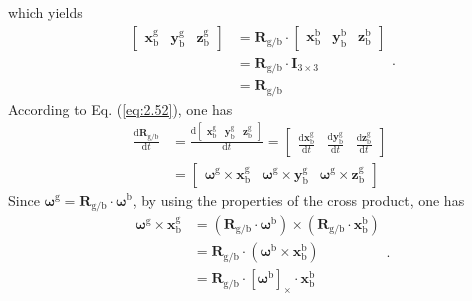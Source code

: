 which yields
\begin{equation}
\begin{array}{ll}
\left[\begin{array}{ccc}
\mathbf{x}_{\text{b}}^{\text{g}} & \mathbf{y}_{\text{b}}^{\text{g}} & \mathbf{z}_{\text{b}}^{\text{g}}\end{array}\right] & ={\mathbf{R}}_{\text{{g}/{b}}}\cdot\left[\begin{array}{ccc}
\mathbf{x}_{\text{b}}^{\text{b}} & \mathbf{y}_{\text{b}}^{\text{b}} & \mathbf{z}_{\text{b}}^{\text{b}}\end{array}\right]\\
& ={\mathbf{R}}_{\text{{g}/{b}}}\cdot\mathbf{I}_{3\times3}\\
& ={\mathbf{R}}_{\text{{g}/{b}}}
\end{array}.
\end{equation}
According to Eq. (\ref{eq:2.52}), one has 
\begin{equation}
\begin{array}{ll}
\frac{\text{d}{{\mathbf{R}}_{\text{{g}/{b}}}}}{\text{d}t} & =\frac{\text{d}\left[\begin{array}{ccc}
	\mathbf{x}_{\text{b}}^{\text{g}} & \mathbf{y}_{\text{b}}^{\text{g}} & \mathbf{z}_{\text{b}}^{\text{g}}\end{array}\right]}{\text{d}t}=\left[\begin{array}{clc}
\frac{\text{d}\mathbf{x}_{\text{b}}^{\text{g}}}{\text{d}t} & \frac{\text{d}\mathbf{y}_{\text{b}}^{\text{g}}}{\text{d}t} & \frac{\text{d}\mathbf{z}_{\text{b}}^{\text{g}}}{\text{d}t}\end{array}\right]\\
& =\left[\begin{array}{ccc}
{\boldsymbol{\omega}}^{\text{g}}\times\mathbf{x}_{\text{b}}^{\text{g}} & {\boldsymbol{\omega}}^{\text{g}}\times\mathbf{y}_{\text{b}}^{\text{g}} & {\boldsymbol{\omega}}^{\text{g}}\times\mathbf{z}_{\text{b}}^{\text{g}}\end{array}\right]
\end{array}\label{eq:2.55}
\end{equation}
Since ${{\boldsymbol{\omega}}^{\text{g}}}={{\mathbf{R}}_{\text{{g}/{b}}}}\cdot{{\boldsymbol{\omega}}^{\text{b}}}$,
by using the properties of the cross product, one has
\begin{equation}
\begin{array}{ll}
{\boldsymbol{\omega}}^{\text{g}}\times\mathbf{x}_{\text{b}}^{\text{g}} & =\left({{\mathbf{R}}_{\text{{g}/{b}}}}\cdot{{\boldsymbol{\omega}}^{\text{b}}}\right)\times\left({{\mathbf{R}}_{\text{{g}/{b}}}}\cdot\mathbf{x}_{\text{b}}^{\text{b}}\right)\\
& ={{\mathbf{R}}_{\text{{g}/{b}}}}\cdot\left({\boldsymbol{\omega}}^{\text{b}}\times\mathbf{x}_{\text{b}}^{\text{b}}\right)\\
& ={{\mathbf{R}}_{\text{{g}/{b}}}}\cdot{\left[{{\boldsymbol{\omega}}^{\text{b}}}\right]}_{\times}\cdot\mathbf{x}_{\text{b}}^{\text{b}}
\end{array}.\label{eq:ss}
\end{equation}
